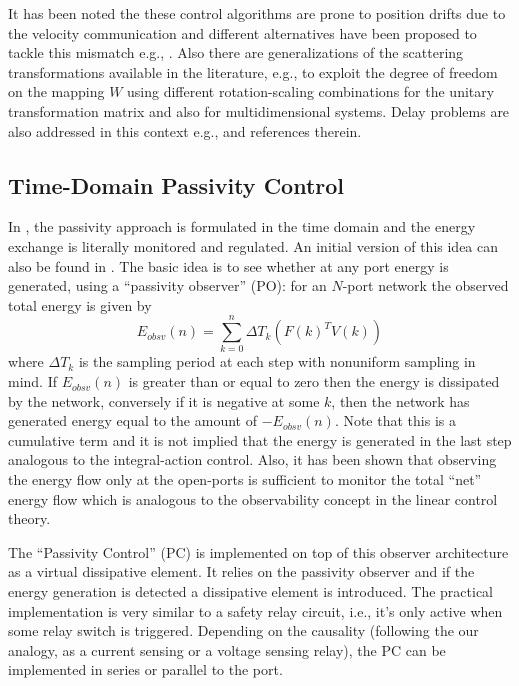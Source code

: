 It has been noted the these control algorithms are prone to position drifts due to the velocity communication and 
different alternatives have been proposed to tackle this mismatch e.g., \cite{yokokohji,chopratro06}. 
Also there are generalizations of the scattering transformations available in the literature, e.g., 
\cite{hirchebuss} to exploit the degree of freedom on the mapping $W$ using different rotation-scaling 
combinations for the unitary transformation matrix and also \cite{stramigioli} for multidimensional systems. 
Delay problems are also addressed in this context e.g., \cite{chopraberes,munirbook,nieslotine97,uedayoshikawa} 
and references therein. 



\subsection{Time-Domain Passivity Control}
In \cite{hannafordryu}, the passivity approach is formulated in the time domain and the energy exchange is literally
monitored and regulated. An initial version of this idea can also be found in \cite{yokokohji}. The basic idea is 
to see whether at any port energy is generated, using a \enquote{passivity observer} (PO): for an $N$-port 
network the observed total energy is given by
\[
E_{obsv}(n) = \sum_{k=0}^n \Delta T_k(F(k)^TV(k))
\]
where $\Delta T_k$ is the sampling period at each step with nonuniform sampling in mind. If 
$E_{obsv}(n) $ is greater than or equal to zero then the energy is dissipated by the network, conversely if
it is negative at some $k$, then the network has generated energy equal to the amount of $-E_{obsv}(n)$. Note that
this is a cumulative term and it is not implied that the energy is generated in the last step analogous to the 
integral-action control. Also, it has been shown that observing the energy flow only at the open-ports is 
sufficient to monitor the total \enquote{net} energy flow which is analogous to the observability concept in the 
linear control theory. 

The \enquote{Passivity Control} (PC) is implemented on top of this observer architecture as a virtual dissipative 
element. It relies on the passivity observer and if the energy generation is detected a dissipative element is 
introduced. The practical implementation is very similar to a safety relay circuit, i.e., it's only active when 
some relay switch is triggered. Depending on the causality (following the our analogy, as a current sensing or a 
voltage sensing relay), the PC can be implemented in series or parallel to the port. 

